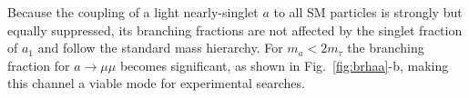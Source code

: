 \documentclass[aps,prl,twocolumn,nofootinbib,superscriptaddress]{revtex4}
\begin{document}
Because the coupling of a light nearly-singlet $a$ to all SM particles is strongly but 
equally suppressed, its branching fractions are not affected by the singlet fraction of 
$a_1$ and follow the standard mass hierarchy. For $m_a < 2m_\tau$ the branching fraction
for $a \to \mu\mu$ becomes significant, as shown in Fig.~\ref{fig:brhaa}-b, making 
this channel a viable mode for experimental searches.




\end{document}

